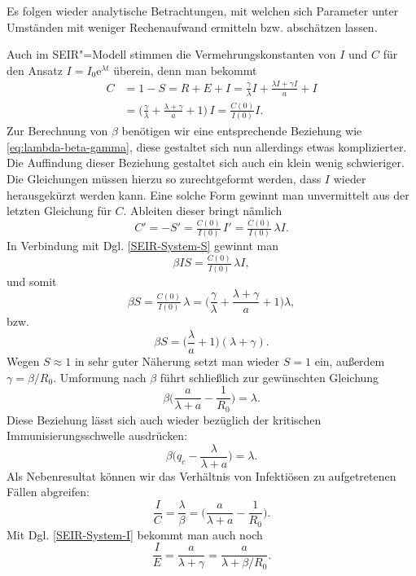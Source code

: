 \documentclass[a4paper,11pt,fleqn,twocolumn,twoside,dvipdfmx]{scrartcl}
\numberwithin{equation}{section}
\newcommand{\ee}{\mathrm e}
\begin{document}
Es folgen wieder analytische Betrachtungen, mit welchen sich
Parameter unter Umständen mit weniger Rechenaufwand ermitteln
bzw. abschätzen lassen.

Auch im SEIR"=Modell stimmen die Vermehrungskonstanten von $I$
und $C$ für den Ansatz $I=I_0\ee^{\lambda t}$ überein, denn man bekommt
\begin{align*}
C &= 1-S = R+E+I = \frac{\gamma}{\lambda}I+\frac{\lambda I+\gamma I}{a}+I\\
&= \Big(\frac{\gamma}{\lambda}+\frac{\lambda+\gamma}{a}+1\Big)\,I
= \tfrac{C(0)}{I(0)} I.
\end{align*}
Zur Berechnung von $\beta$ benötigen wir eine entsprechende Beziehung
wie \eqref{eq:lambda-beta-gamma}, diese gestaltet sich nun allerdings
etwas komplizierter. Die Auffindung dieser Beziehung gestaltet sich
auch ein klein wenig schwieriger. Die Gleichungen müssen hierzu so
zurechtgeformt werden, dass $I$ wieder herausgekürzt werden kann.
Eine solche Form gewinnt man unvermittelt aus der letzten Gleichung
für $C$. Ableiten dieser bringt nämlich
\begin{equation}
C' = -S' = \tfrac{C(0)}{I(0)}\,I' = \tfrac{C(0)}{I(0)}\,\lambda I.
\end{equation}
In Verbindung mit Dgl. \eqref{SEIR-System-S} gewinnt man
\begin{equation}
\beta IS = \tfrac{C(0)}{I(0)}\,\lambda I,
\end{equation}
und somit
\begin{equation}
\beta S = \tfrac{C(0)}{I(0)}\,\lambda
= \Big(\frac{\gamma}{\lambda}+\frac{\lambda+\gamma}{a}+1\Big)\lambda,
\end{equation}
bzw.
\begin{equation}
\beta S = \Big(\frac{\lambda}{a}+1\Big)(\lambda+\gamma).
\end{equation}
Wegen $S\approx 1$ in sehr guter Näherung setzt man wieder
$S=1$ ein, außerdem $\gamma=\beta/R_0$. Umformung nach $\beta$
führt schließlich zur gewünschten Gleichung
\begin{equation}
\beta\Big(\frac{a}{\lambda+a}-\frac{1}{R_0}\Big) = \lambda.
\end{equation}
Diese Beziehung lässt sich auch wieder bezüglich der kritischen
Immunisierungsschwelle ausdrücken:
\begin{equation}
\beta\Big(q_c-\frac{\lambda}{\lambda+a}\Big) = \lambda.
\end{equation}
Als Nebenresultat können wir das Verhältnis von Infektiösen
zu aufgetretenen Fällen abgreifen:
\begin{equation}
\frac{I}{C} = \frac{\lambda}{\beta} = \Big(\frac{a}{\lambda+a}-\frac{1}{R_0}\Big).
\end{equation}
Mit Dgl. \eqref{SEIR-System-I} bekommt man auch noch
\begin{equation}
\frac{I}{E} = \frac{a}{\lambda+\gamma} = \frac{a}{\lambda+\beta/R_0}.
\end{equation}
\end{document}
